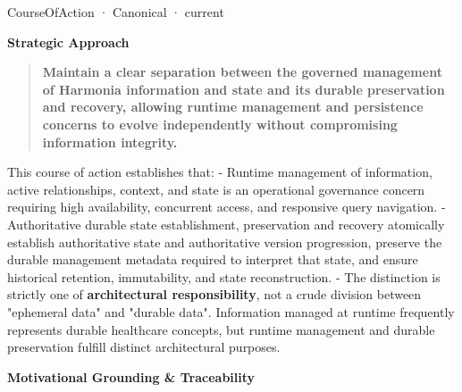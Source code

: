 \label{element:4c71b89477b34733b31e478485e89b1a}
{\small CourseOfAction · Canonical · current}\par

\par\medskip\textbf{Strategic Approach}\par


\begin{quote}


\textbf{Maintain a clear separation between the governed management of Harmonia information and state and its durable preservation and recovery, allowing runtime management and persistence concerns to evolve independently without compromising information integrity.}



\end{quote}


This course of action establishes that:
- Runtime management of information, active relationships, context, and state is an operational governance concern requiring high availability, concurrent access, and responsive query navigation.
- Authoritative durable state establishment, preservation and recovery atomically establish authoritative state and authoritative version progression, preserve the durable management metadata required to interpret that state, and ensure historical retention, immutability, and state reconstruction.
- The distinction is strictly one of \textbf{architectural responsibility}, not a crude division between "ephemeral data" and "durable data". Information managed at runtime frequently represents durable healthcare concepts, but runtime management and durable preservation fulfill distinct architectural purposes.



\par\medskip\textbf{Motivational Grounding \& Traceability}\par


